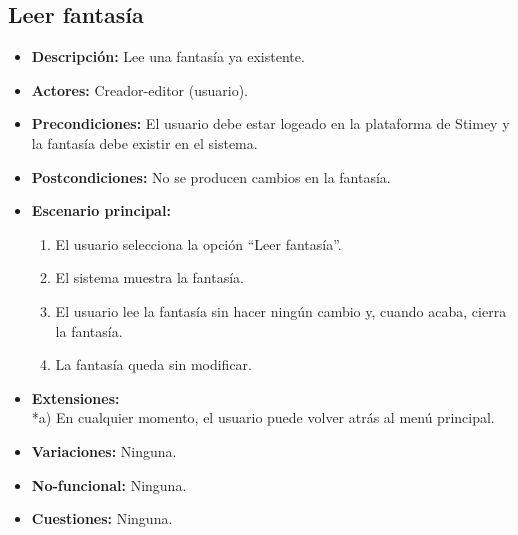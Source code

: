 \documentclass[12pt,letterpaper]{article}
\begin{document}
\subsection{Leer fantasía}
\begin{itemize}
	\item \textbf{Descripción:} Lee una fantasía ya existente.
	\item \textbf{Actores:} Creador-editor (usuario).
	\item \textbf{Precondiciones:} El usuario debe estar logeado en la plataforma de Stimey y la fantasía debe existir en el sistema.
	\item \textbf{Postcondiciones:} No se producen cambios en la fantasía.
	\item \textbf{Escenario principal:}
	\begin{enumerate}
		\item El usuario selecciona la opción ``Leer fantasía''.
		\item El sistema muestra la fantasía.
		\item El usuario lee la fantasía sin hacer ningún cambio y, cuando acaba, cierra la fantasía.
		\item La fantasía queda sin modificar.
	\end{enumerate}
	\item \textbf{Extensiones:} \\ *a) En cualquier momento, el usuario puede volver atrás al menú principal.
	\item \textbf{Variaciones:} Ninguna.
	\item \textbf{No-funcional:} Ninguna.
	\item \textbf{Cuestiones:} Ninguna.
\end{itemize}
\end{document}
